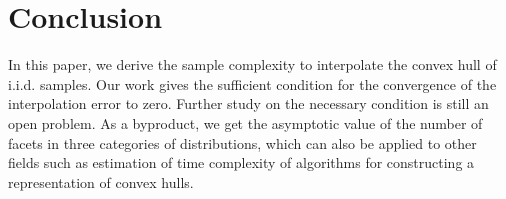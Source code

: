 \documentclass[conference,a4paper]{IEEEtran}
\begin{document}
\section{Conclusion}
\label{sec:conclusion}
In this paper, we derive the sample complexity to interpolate
the convex hull of i.i.d. samples. Our work gives the sufficient
condition for the convergence of the interpolation error to zero.
Further study on the necessary condition is still an open problem.
As a byproduct, we get the asymptotic value of the number of facets
in three categories of distributions, which can also be applied
to other fields such as estimation of time complexity of algorithms
for constructing a representation of convex hulls.




%



\appendix
\end{document}
